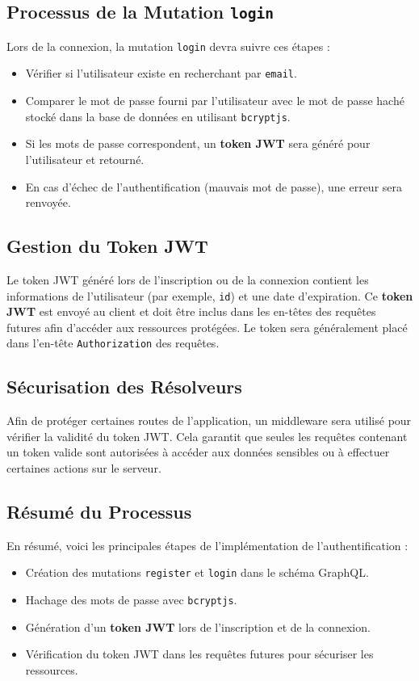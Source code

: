 \documentclass{article}
\begin{document}
\subsection{Processus de la Mutation \texttt{login}}
Lors de la connexion, la mutation \texttt{login} devra suivre ces étapes :
\begin{itemize}
    \item Vérifier si l'utilisateur existe en recherchant par \texttt{email}.
    \item Comparer le mot de passe fourni par l'utilisateur avec le mot de passe haché stocké dans la base de données en utilisant \texttt{bcryptjs}.
    \item Si les mots de passe correspondent, un \textbf{token JWT} sera généré pour l'utilisateur et retourné.
    \item En cas d'échec de l'authentification (mauvais mot de passe), une erreur sera renvoyée.
\end{itemize}

\subsection{Gestion du Token JWT}
Le token JWT généré lors de l'inscription ou de la connexion contient les informations de l'utilisateur (par exemple, \texttt{id}) et une date d'expiration. 
Ce \textbf{token JWT} est envoyé au client et doit être inclus dans les en-têtes des requêtes futures afin d'accéder aux ressources protégées. 
Le token sera généralement placé dans l'en-tête \texttt{Authorization} des requêtes.

\subsection{Sécurisation des Résolveurs}
Afin de protéger certaines routes de l'application, un middleware sera utilisé pour vérifier la validité du token JWT. 
Cela garantit que seules les requêtes contenant un token valide sont autorisées à accéder aux données sensibles ou à effectuer certaines actions sur le serveur.

\subsection{Résumé du Processus}
En résumé, voici les principales étapes de l'implémentation de l'authentification :
\begin{itemize}
    \item Création des mutations \texttt{register} et \texttt{login} dans le schéma GraphQL.
    \item Hachage des mots de passe avec \texttt{bcryptjs}.
    \item Génération d'un \textbf{token JWT} lors de l'inscription et de la connexion.
    \item Vérification du token JWT dans les requêtes futures pour sécuriser les ressources.
\end{itemize}
\end{document}
